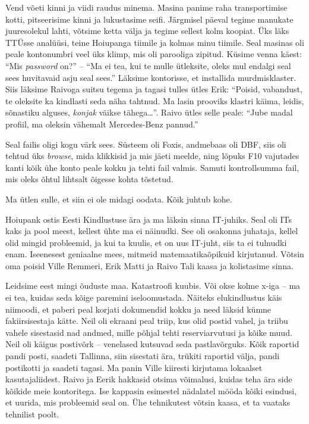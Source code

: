 Vend võeti kinni ja viidi raudus minema. Masina panime raha transportimise kotti, pitseerisime 
kinni ja lukustasime seifi. Järgmisel päeval tegime manukate juuresolekul lahti, võtsime 
ketta välja ja tegime sellest kolm koopiat. Üks läks TTÜsse analüüsi, teine Hoiupanga 
tiimile ja kolmas minu tiimile. Seal masinas oli peale kontonumbri veel üks 
klimp, mis oli parooliga zipitud. Küsime venna käest: \enquote{Mis \emph{password} on?} -- \enquote{Ma ei 
tea, kui te mulle ütleksite, oleks mul endalgi seal sees huvitavaid asju seal sees.} 
Läksime kontorisse, et installida murdmisklaster. Siis läksime 
Raivoga suitsu tegema ja tagasi tulles ütles 
Erik: \enquote{Poisid, vabandust, te oleksite ka 
kindlasti seda näha tahtnud. Ma lasin prooviks klastri käima, leidis, sõnastiku alguses, 
\emph{konjak} väikse tähega\ldots}. Raivo ütles selle peale: \enquote{Jube madal 
profiil, ma oleksin vähemalt Mercedes-Benz pannud.} 

Seal failis oligi kogu värk sees. Süsteem oli Foxis, andmebaas oli DBF, siis 
oli tehtud üks \emph{browse}, mida klikkisid ja mis jäeti meelde, ning lõpuks F10 
vajutades kanti kõik ühe konto peale kokku ja tehti fail valmis. Samuti
kontrollsumma fail, mis oleks õhtul lihtsalt õigesse kohta 
tõstetud. 


Ma ütlen sulle, et siin ei ole midagi oodata. Kõik juhtub kohe.

Hoiupank ostis Eesti Kindlustuse ära ja ma läksin sinna IT-juhiks. Seal oli ITs 
kaks ja pool meest, kellest ühte ma ei näinudki. See oli osakonna juhataja, kellel 
olid mingid probleemid, ja kui ta kuulis, et on uus IT-juht, siis ta ei 
tulnudki enam. Iseenesest geniaalne mees, mitmeid matemaatikaõpikuid 
kirjutanud. Võtsin oma poisid Ville 
Remmeri, Erik Matti ja Raivo 
Tali kaasa ja kolistasime sinna. 

Leidsime eest mingi õuduste maa. Katastroofi kuubis. Või okse kolme x-iga -- ma ei tea, kuidas seda kõige paremini
iseloomustada. Näiteks elukindlustus käis niimoodi, et paberi peal korjati dokumendid 
kokku ja need läksid kümne fakiirsisestaja kätte. Neil oli ekraani peal triip, 
kus olid postid vahel, ja triibu vahele sisestasid nad andmed, mille põhjal 
tehti reserviarvutusi ja kõike muud. Neil oli käigus postivõrk -- venelased kutsuvad seda
pastlavõrguks. Kõik raportid pandi posti, 
saadeti Tallinna, siin sisestati ära, trükiti raportid välja, pandi postikotti 
ja saadeti tagasi. Ma panin Ville kiiresti kirjutama lokaalset kasutajaliidest. 
Raivo ja Eerik hakkasid otsima võimalusi, kuidas teha ära side kõikide meie 
kontoritega. Ise kappasin esimestel nädalatel mööda kõiki esindusi, et uurida, mis 
probleemid seal on. Ühe tehnikutest võtsin kaasa, et ta vaataks tehnilist 
poolt. 

